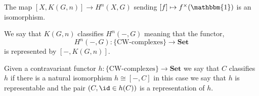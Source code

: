 \documentclass[12pt]{extarticle}
\begin{document}
\begin{theorem}
The map $[X, K(G, n)] \to H^n(X, G)$ sending $[f] \mapsto f^\times(\mathbbm{1})$ is an isomorphism. 
\end{theorem}

\begin{remark}
We say that $K(G, n)$ classifies $H^n(-,G)$ meaning that the functor,
\[ H^n(-,G) : \{ \text{CW-complexes} \} \to \mathbf{Set} \]
 is represented by $[-, K(G,n)]$.
\end{remark}

\begin{definition}
Given a contravariant functor $h : \{ \text{CW-complexes} \} \to \mathbf{Set}$ we say that $C$ classifies $h$ if there is a natural isomorphism $h \cong [-, C]$ in this case we say that $h$ is representable and the pair $(C, \id \in h(C))$ is a representation of $h$. 
\end{definition}
\end{document}
